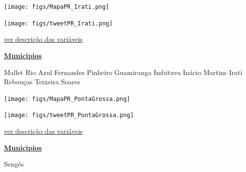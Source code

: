 \documentclass[10pt]{article} %
\begin{document}
\begin{minipage}[t]{.66\linewidth}
\hypertarget{Irat}{}
\texttt{[image: figs/MapaPR\_Irati.png]}\vspace{0.5cm}\vspace{0.5cm}\begin{center}
\texttt{[image: figs/tweetPR\_Irati.png]}\end{center}
\begin{center}

\end{center}
\small{\hyperlink{vartab}{ver descrição das variáveis}}\end{minipage}\hfill\begin{minipage}[t]{.30\linewidth}
\begin{mdframed}[style=sidebar,frametitle={}]
\textbf{\hyperlink{municips}{Municipios}}\begin{itemize}\gsquare Mallet 
\gsquare Rio Azul 
\gsquare Fernandes Pinheiro 
\gsquare Guamiranga 
\gsquare Imbituva 
\gsquare Inácio Martins 
\gsquare Irati 
\gsquare Rebouças 
\gsquare Teixeira Soares 
\end{itemize}\BackToContents\end{mdframed}\hfill\end{minipage}\newpage\begin{minipage}[t]{.66\linewidth}
\hypertarget{PntG}{}
\texttt{[image: figs/MapaPR\_PontaGrossa.png]}\vspace{0.5cm}\vspace{0.5cm}\begin{center}
\texttt{[image: figs/tweetPR\_PontaGrossa.png]}\end{center}
\begin{center}

\end{center}
\small{\hyperlink{vartab}{ver descrição das variáveis}}\end{minipage}\hfill\begin{minipage}[t]{.30\linewidth}
\begin{mdframed}[style=sidebar,frametitle={}]
\textbf{\hyperlink{municips}{Municipios}}\begin{itemize}\gsquare Sengés 

\end{itemize}
\end{mdframed}
\end{minipage}
\end{document}
